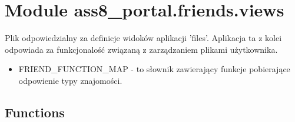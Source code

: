 %
%
%


\section{Module ass8\_portal.friends.views}

    \label{ass8_portal:friends:views}
Plik odpowiedzialny za definicje widoków aplikacji 'files'. Aplikacja ta z 
kolei odpowiada za funkcjonalość związaną z zarządzaniem plikami 
użytkownika.

\begin{itemize}
\setlength{\parskip}{0.6ex}
  \item FRIEND\_FUNCTION\_MAP - to słownik zawierający funkcje pobierające 
    odpowienie typy znajomości.

\end{itemize}



  \subsection{Functions}

    \label{ass8_portal:friends:views:friends_manage}

    \vspace{0.5ex}

